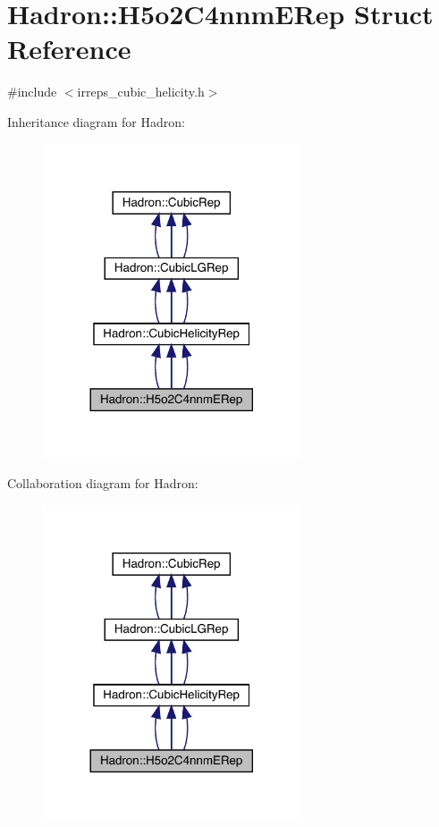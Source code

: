 \hypertarget{structHadron_1_1H5o2C4nnmERep}{}\section{Hadron\+:\+:H5o2\+C4nnm\+E\+Rep Struct Reference}
\label{structHadron_1_1H5o2C4nnmERep}


{\ttfamily \#include $<$irreps\+\_\+cubic\+\_\+helicity.\+h$>$}



Inheritance diagram for Hadron\+:
\nopagebreak
\begin{figure}[H]
\begin{center}
\leavevmode
\includegraphics[width=216pt]{dc/de7/structHadron_1_1H5o2C4nnmERep__inherit__graph}
\end{center}
\end{figure}


Collaboration diagram for Hadron\+:
\nopagebreak
\begin{figure}[H]
\begin{center}
\leavevmode
\includegraphics[width=216pt]{d2/dff/structHadron_1_1H5o2C4nnmERep__coll__graph}
\end{center}
\end{figure}
